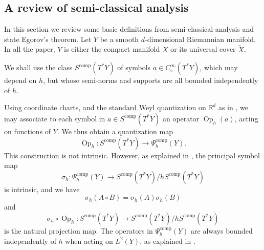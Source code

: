 \documentclass[10pt]{amsart}
\newcommand{\rc}{\mathrm{c}}
\newcommand{\comp}{\mathrm{comp}}
\DeclareMathOperator{\Op}{Op}
\theoremstyle{plain}
\theoremstyle{definition}
\begin{document}
\begin{appendix}
\section{A review of semi-classical analysis}\label{sec:semi-classique}
In this section we review some basic definitions from semi-classical analysis and state Egorov's theorem. Let $Y$ be a smooth $d$-dimensional Riemannian manifold. In all the paper, $Y$ is either the compact manifold $X$ or its universal cover $\widetilde{X}$.

We shall use the class $S^{\comp}(T^*Y)$ of symbols $a\in C_\rc^\infty(T^*Y)$,
which may depend on $h$, but whose semi-norms and supports are all bounded
independently of $h$.

Using coordinate charts, and the standard Weyl quantization on $\mathbb{R}^d$ as in \cite[\S 14.2]{Zworski_2012}, we may associate to each symbol in $a\in S^{\comp}(T^*Y)$ an operator $\Op_h(a)$, acting on functions of $Y$. We thus obtain a quantization map
\begin{equation*}
\Op_h:S^{\comp}(T^*Y)\to \Psi^{\comp}_h(Y).
\end{equation*}
This construction is not intrinsic. However, as explained in \cite[Th.\,14.2]{Zworski_2012}, the principal
symbol map
\begin{equation*}
\sigma_h : \Psi^{\comp}_h (Y)\to S^{\comp}(T^*Y)/
h S^{\comp}(T^*Y)
\end{equation*} is intrinsic, and we have
\begin{equation*}\sigma_h(A\circ B) = \sigma_h (A) \sigma_h(B)
\end{equation*}
and\vspace*{-3pt}
\begin{equation*}
\sigma_h\circ \Op_h: S^{\comp}(T^* Y) \to S^{\comp} (T^*Y) /h
S^{\comp}(T^*Y)
\end{equation*}
is the natural projection map. The operators in $\Psi_h^{\comp}(Y)$ are always bounded independently of $h$ when acting on $L^2(Y)$, as explained in \cite[Th.\,14.2]{Zworski_2012}.


\end{appendix}
\end{document}
